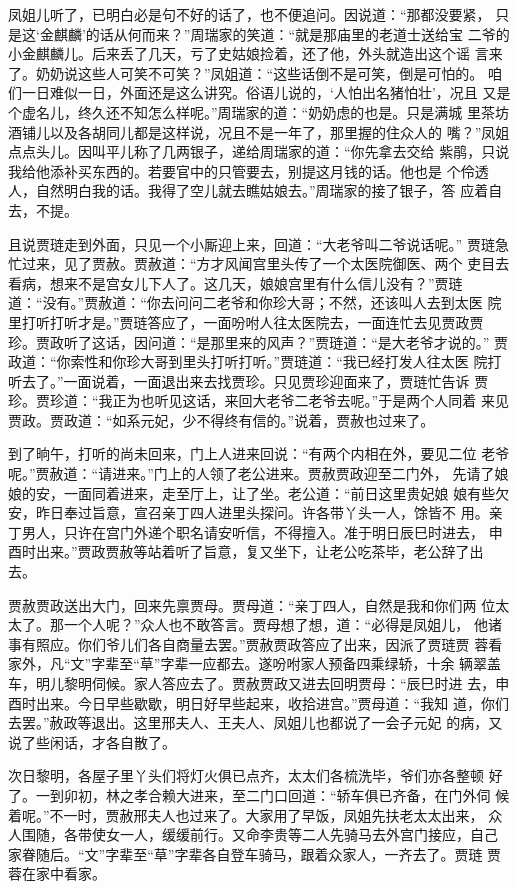 凤姐儿听了，已明白必是句不好的话了，也不便追问。因说道：“那都没要紧，
只是这‘金麒麟’的话从何而来？”周瑞家的笑道：“就是那庙里的老道士送给宝
二爷的小金麒麟儿。后来丢了几天，亏了史姑娘捡着，还了他，外头就造出这个谣
言来了。奶奶说这些人可笑不可笑？”凤姐道：“这些话倒不是可笑，倒是可怕的。
咱们一日难似一日，外面还是这么讲究。俗语儿说的，‘人怕出名猪怕壮’，况且
又是个虚名儿，终久还不知怎么样呢。”周瑞家的道：“奶奶虑的也是。只是满城
里茶坊酒铺儿以及各胡同儿都是这样说，况且不是一年了，那里握的住众人的
嘴？”凤姐点点头儿。因叫平儿称了几两银子，递给周瑞家的道：“你先拿去交给
紫鹃，只说我给他添补买东西的。若要官中的只管要去，别提这月钱的话。他也是
个伶透人，自然明白我的话。我得了空儿就去瞧姑娘去。”周瑞家的接了银子，答
应着自去，不提。

且说贾琏走到外面，只见一个小厮迎上来，回道：“大老爷叫二爷说话呢。”
贾琏急忙过来，见了贾赦。贾赦道：“方才风闻宫里头传了一个太医院御医、两个
吏目去看病，想来不是宫女儿下人了。这几天，娘娘宫里有什么信儿没有？”贾琏
道：“没有。”贾赦道：“你去问问二老爷和你珍大哥；不然，还该叫人去到太医
院里打听打听才是。”贾琏答应了，一面吩咐人往太医院去，一面连忙去见贾政贾
珍。贾政听了这话，因问道：“是那里来的风声？”贾琏道：“是大老爷才说的。”
贾政道：“你索性和你珍大哥到里头打听打听。”贾琏道：“我已经打发人往太医
院打听去了。”一面说着，一面退出来去找贾珍。只见贾珍迎面来了，贾琏忙告诉
贾珍。贾珍道：“我正为也听见这话，来回大老爷二老爷去呢。”于是两个人同着
来见贾政。贾政道：“如系元妃，少不得终有信的。”说着，贾赦也过来了。

到了晌午，打听的尚未回来，门上人进来回说：“有两个内相在外，要见二位
老爷呢。”贾赦道：“请进来。”门上的人领了老公进来。贾赦贾政迎至二门外，
先请了娘娘的安，一面同着进来，走至厅上，让了坐。老公道：“前日这里贵妃娘
娘有些欠安，昨日奉过旨意，宣召亲丁四人进里头探问。许各带丫头一人，馀皆不
用。亲丁男人，只许在宫门外递个职名请安听信，不得擅入。准于明日辰巳时进去，
申酉时出来。”贾政贾赦等站着听了旨意，复又坐下，让老公吃茶毕，老公辞了出
去。

贾赦贾政送出大门，回来先禀贾母。贾母道：“亲丁四人，自然是我和你们两
位太太了。那一个人呢？”众人也不敢答言。贾母想了想，道：“必得是凤姐儿，
他诸事有照应。你们爷儿们各自商量去罢。”贾赦贾政答应了出来，因派了贾琏贾
蓉看家外，凡“文”字辈至“草”字辈一应都去。遂吩咐家人预备四乘绿轿，十余
辆翠盖车，明儿黎明伺候。家人答应去了。贾赦贾政又进去回明贾母：“辰巳时进
去，申酉时出来。今日早些歇歇，明日好早些起来，收拾进宫。”贾母道：“我知
道，你们去罢。”赦政等退出。这里邢夫人、王夫人、凤姐儿也都说了一会子元妃
的病，又说了些闲话，才各自散了。

次日黎明，各屋子里丫头们将灯火俱已点齐，太太们各梳洗毕，爷们亦各整顿
好了。一到卯初，林之孝合赖大进来，至二门口回道：“轿车俱已齐备，在门外伺
候着呢。”不一时，贾赦邢夫人也过来了。大家用了早饭，凤姐先扶老太太出来，
众人围随，各带使女一人，缓缓前行。又命李贵等二人先骑马去外宫门接应，自己
家眷随后。“文”字辈至“草”字辈各自登车骑马，跟着众家人，一齐去了。贾琏
贾蓉在家中看家。

